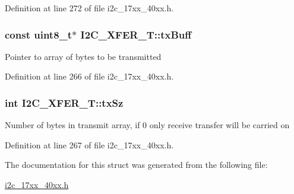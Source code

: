 Definition at line 272 of file i2c\+\_\+17xx\+\_\+40xx.\+h.

\subsubsection[{\texorpdfstring{tx\+Buff}{txBuff}}]{\setlength{\rightskip}{0pt plus 5cm}const uint8\+\_\+t$\ast$ I2\+C\+\_\+\+X\+F\+E\+R\+\_\+\+T\+::tx\+Buff}\hypertarget{structI2C__XFER__T_a673ce41b59a715c6e91e3d041885554b}{}\label{structI2C__XFER__T_a673ce41b59a715c6e91e3d041885554b}
Pointer to array of bytes to be transmitted 

Definition at line 266 of file i2c\+\_\+17xx\+\_\+40xx.\+h.

\subsubsection[{\texorpdfstring{tx\+Sz}{txSz}}]{\setlength{\rightskip}{0pt plus 5cm}int I2\+C\+\_\+\+X\+F\+E\+R\+\_\+\+T\+::tx\+Sz}\hypertarget{structI2C__XFER__T_a6ff8668411b06d3dc4ab9d942ffca896}{}\label{structI2C__XFER__T_a6ff8668411b06d3dc4ab9d942ffca896}
Number of bytes in transmit array, if 0 only receive transfer will be carried on 

Definition at line 267 of file i2c\+\_\+17xx\+\_\+40xx.\+h.



The documentation for this struct was generated from the following file\+:\begin{DoxyCompactItemize}
\item 
\hyperlink{i2c__17xx__40xx_8h}{i2c\+\_\+17xx\+\_\+40xx.\+h}\end{DoxyCompactItemize}
